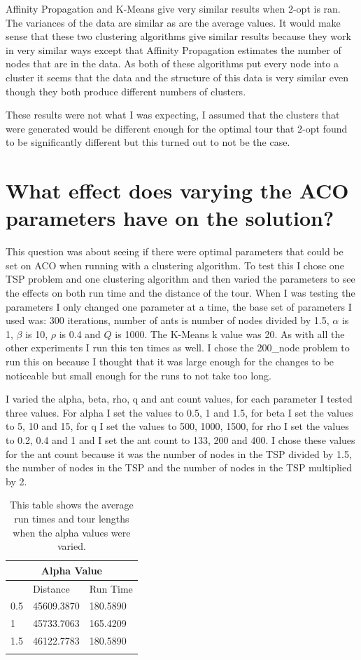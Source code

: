 Affinity Propagation and K-Means give very similar results when 2-opt is ran. The variances of the data are similar as are the average values. It would make sense that these two clustering algorithms give similar results because they work in very similar ways except that Affinity Propagation estimates the number of nodes that are in the data. As both of these algorithms put every node into a cluster it seems that the data and the structure of this data is very similar even though they both produce different numbers of clusters.

These results were not what I was expecting, I assumed that the clusters that were generated would be different enough for the optimal tour that 2-opt found to be significantly different but this turned out to not be the case.

\section{What effect does varying the ACO parameters have on the solution?}

This question was about seeing if there were optimal parameters that could be set on ACO when running with a clustering algorithm. To test this I chose one TSP problem and one clustering algorithm and then varied the parameters to see the effects on both run time and the distance of the tour. When I was testing the parameters I only changed one parameter at a time, the base set of parameters I used was: 300 iterations, number of ants is number of nodes divided by 1.5, $\alpha$ is 1, $\beta$ is 10, $\rho$ is 0.4 and $Q$ is 1000. The K-Means k value was 20. As with all the other experiments I run this ten times as well. I chose the 200\_node problem to run this on because I thought that it was large enough for the changes to be noticeable but small enough for the runs to not take too long.

I varied the alpha, beta, rho, q and ant count values, for each parameter I tested three values. For alpha I set the values to 0.5, 1 and 1.5, for beta I set the values to 5, 10 and 15, for q I set the values to 500, 1000, 1500, for rho I set the values to 0.2, 0.4 and 1 and I set the ant count to 133, 200 and 400. I chose these values for the ant count because it was the number of nodes in the TSP divided by 1.5, the number of nodes in the TSP and the number of nodes in the TSP multiplied by 2.

\begin{longtable}[c]{|l|l|l|}
\hline
\multicolumn{3}{|c|}{Alpha Value} \\ \hline
\endhead
%
     & Distance     & Run Time    \\ \hline
0.5  & 45609.3870   & 180.5890    \\ \hline
1    & 45733.7063   & 165.4209   \\ \hline
1.5  & 46122.7783  & 180.5890 \\ \hline
\caption{This table shows the average run times and tour lengths when the alpha values were varied.}
\label{tab:alpha_aco_table}\\
\end{longtable}

